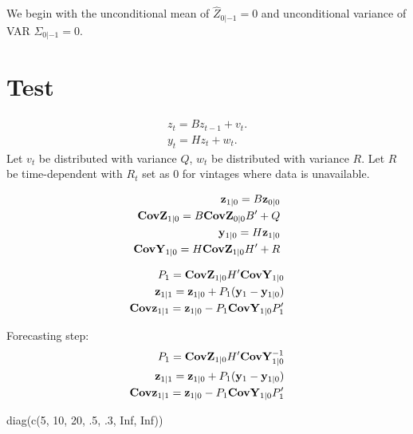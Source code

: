 \documentclass[11pt, letterpaper]{article}
\newcommand{\vv}[1]{\textcolor{black}{\mathbf{#1}}}
\begin{document}
We begin with the unconditional mean of $\widehat{Z}_{0|-1} = 0$ and unconditional variance of VAR $\Sigma_{0|-1} = 0$.

\section{Test}
\begin{align*}
	z_t = B z_{t-1} + v_t.  \tag{state equation}\\
	y_t = H z_{t} + w_t. \tag{measurement equation}
\end{align*}
Let $v_t$ be distributed with variance $Q$, $w_t$ be distributed with variance $R$. Let $R$ be time-dependent with $R_t$ set as 0 for vintages where data is unavailable.

\begin{align*}
	\vv{z}_{1|0} = B \vv{z}_{0|0}\\
	\vv{CovZ}_{1|0} = B \vv{CovZ}_{0|0}B' + Q\\
	\vv{y}_{1|0} = H \vv{z}_{1|0}\\
	\vv{CovY}_{1|0} = H \vv{CovZ}_{1|0} H' + R
\end{align*}

\begin{align*}
	P_{1} = \vv{CovZ}_{1|0} H' \vv{CovY}_{1|0}\\
	\vv{z}_{1|1} = \vv{z}_{1|0} + P_1 (\vv{y}_1 - \vv{y}_{1|0})\\
	\vv{Covz}_{1|1} = \vv{z}_{1|0} - P_1 \vv{CovY}_{1|0} P'_1
\end{align*}

Forecasting step:
\begin{align*}
	P_{1} = \vv{CovZ}_{1|0} H' \vv{CovY}^{-1}_{1|0}\\
	\vv{z}_{1|1} = \vv{z}_{1|0} + P_1 (\vv{y}_1 - \vv{y}_{1|0})\\
	\vv{Covz}_{1|1} = \vv{z}_{1|0} - P_1 \vv{CovY}_{1|0} P'_1
\end{align*}


diag(c(5, 10, 20, .5, .3, Inf, Inf)) %
\end{document}
